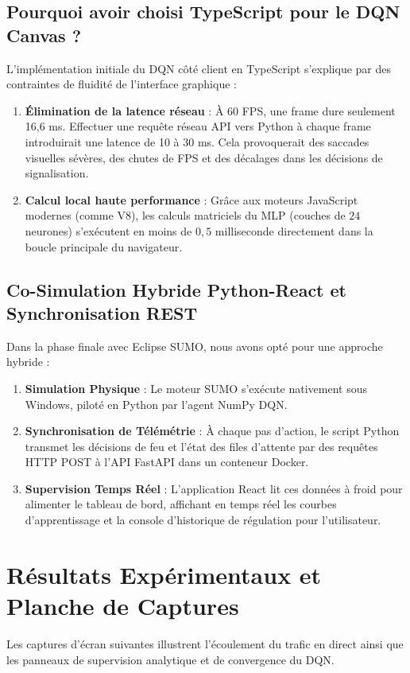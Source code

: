 \documentclass[11pt,a4paper]{article}
\begin{document}
\subsection{Pourquoi avoir choisi TypeScript pour le DQN Canvas ?}
L'implémentation initiale du DQN côté client en TypeScript s'explique par des contraintes de fluidité de l'interface graphique :
\begin{enumerate}
    \item \textbf{Élimination de la latence réseau} : À 60 FPS, une frame dure seulement 16,6 ms. Effectuer une requête réseau API vers Python à chaque frame introduirait une latence de 10 à 30 ms. Cela provoquerait des saccades visuelles sévères, des chutes de FPS et des décalages dans les décisions de signalisation.
    \item \textbf{Calcul local haute performance} : Grâce aux moteurs JavaScript modernes (comme V8), les calculs matriciels du MLP (couches de $24$ neurones) s'exécutent en moins de $0,5$ milliseconde directement dans la boucle principale du navigateur.
\end{enumerate}

\subsection{Co-Simulation Hybride Python-React et Synchronisation REST}
Dans la phase finale avec Eclipse SUMO, nous avons opté pour une approche hybride :
\begin{enumerate}
    \item \textbf{Simulation Physique} : Le moteur SUMO s'exécute nativement sous Windows, piloté en Python par l'agent NumPy DQN.
    \item \textbf{Synchronisation de Télémétrie} : À chaque pas d'action, le script Python transmet les décisions de feu et l'état des files d'attente par des requêtes HTTP POST à l'API FastAPI dans un conteneur Docker.
    \item \textbf{Supervision Temps Réel} : L'application React lit ces données à froid pour alimenter le tableau de bord, affichant en temps réel les courbes d'apprentissage et la console d'historique de régulation pour l'utilisateur.
\end{enumerate}

\section{Résultats Expérimentaux et Planche de Captures}
Les captures d'écran suivantes illustrent l'écoulement du trafic en direct ainsi que les panneaux de supervision analytique et de convergence du DQN.
\end{document}
